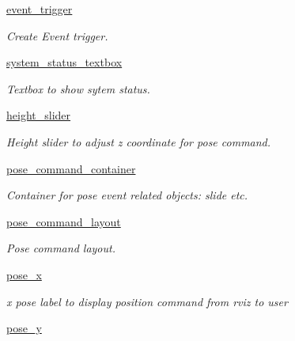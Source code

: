 \begin{DoxyCompactItemize}
\item 
\hyperlink{classaerial__autonomy_1_1aerial__autonomy__gui_1_1EventTransmissionGUI_a28f1de5a0d232285414764f25e43a7eb}{event\-\_\-trigger}
\begin{DoxyCompactList}\small\item\em Create Event trigger. \end{DoxyCompactList}\item 
\hyperlink{classaerial__autonomy_1_1aerial__autonomy__gui_1_1EventTransmissionGUI_a2e96f52dc90edde242b5387214a82858}{system\-\_\-status\-\_\-textbox}
\begin{DoxyCompactList}\small\item\em Textbox to show sytem status. \end{DoxyCompactList}\item 
\hyperlink{classaerial__autonomy_1_1aerial__autonomy__gui_1_1EventTransmissionGUI_a6118098a267761831ef8d83cbf2a78bd}{height\-\_\-slider}
\begin{DoxyCompactList}\small\item\em Height slider to adjust z coordinate for pose command. \end{DoxyCompactList}\item 
\hyperlink{classaerial__autonomy_1_1aerial__autonomy__gui_1_1EventTransmissionGUI_af611df98da28aba90ce5fcbea285603a}{pose\-\_\-command\-\_\-container}
\begin{DoxyCompactList}\small\item\em Container for pose event related objects\-: slide etc. \end{DoxyCompactList}\item 
\hyperlink{classaerial__autonomy_1_1aerial__autonomy__gui_1_1EventTransmissionGUI_a966d066bb1db4ea2517dc68335b3df98}{pose\-\_\-command\-\_\-layout}
\begin{DoxyCompactList}\small\item\em Pose command layout. \end{DoxyCompactList}\item 
\hyperlink{classaerial__autonomy_1_1aerial__autonomy__gui_1_1EventTransmissionGUI_a750b19ad6b27411d6ff502aa4ba43ed8}{pose\-\_\-x}
\begin{DoxyCompactList}\small\item\em x pose label to display position command from rviz to user \end{DoxyCompactList}\item 
\hyperlink{classaerial__autonomy_1_1aerial__autonomy__gui_1_1EventTransmissionGUI_a279bc7aaaf956e4fc14ad3e62bf7b4d2}{pose\-\_\-y}

\end{DoxyCompactItemize}
